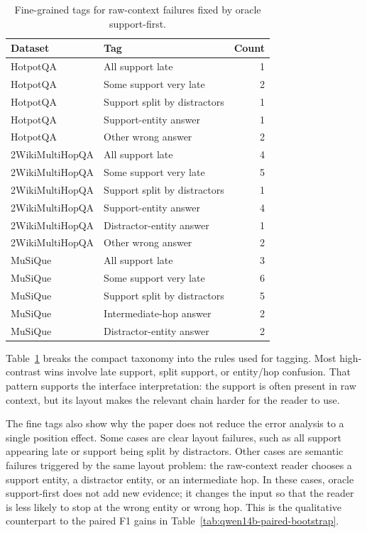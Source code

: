 \documentclass[a4paper,fleqn]{cas-sc}
\begin{document}
\begin{table}[!hbp]
\centering
\caption{Fine-grained tags for raw-context failures fixed by oracle support-first.}
\label{tab:appendix-error-fine-tags}
\scriptsize
\setlength{\tabcolsep}{4pt}
\begin{tabular}{llr}
\toprule
Dataset & Tag & Count \\
\midrule
HotpotQA & All support late & 1 \\
HotpotQA & Some support very late & 2 \\
HotpotQA & Support split by distractors & 1 \\
HotpotQA & Support-entity answer & 1 \\
HotpotQA & Other wrong answer & 2 \\
\midrule
2WikiMultiHopQA & All support late & 4 \\
2WikiMultiHopQA & Some support very late & 5 \\
2WikiMultiHopQA & Support split by distractors & 1 \\
2WikiMultiHopQA & Support-entity answer & 4 \\
2WikiMultiHopQA & Distractor-entity answer & 1 \\
2WikiMultiHopQA & Other wrong answer & 2 \\
\midrule
MuSiQue & All support late & 3 \\
MuSiQue & Some support very late & 6 \\
MuSiQue & Support split by distractors & 5 \\
MuSiQue & Intermediate-hop answer & 2 \\
MuSiQue & Distractor-entity answer & 2 \\
\bottomrule
\end{tabular}
\end{table}

Table~\ref{tab:appendix-error-fine-tags} breaks the compact taxonomy into the
rules used for tagging. Most high-contrast wins involve late support, split
support, or entity/hop confusion. That pattern supports the interface
interpretation: the support is often present in raw context, but its layout
makes the relevant chain harder for the reader to use.

The fine tags also show why the paper does not reduce the error analysis to a
single position effect. Some cases are clear layout failures, such as all
support appearing late or support being split by distractors. Other cases are
semantic failures triggered by the same layout problem: the raw-context reader
chooses a support entity, a distractor entity, or an intermediate hop. In these
cases, oracle support-first does not add new evidence; it changes the input so
that the reader is less likely to stop at the wrong entity or wrong hop. This
is the qualitative counterpart to the paired F1 gains in
Table~\ref{tab:qwen14b-paired-bootstrap}.
\end{document}
